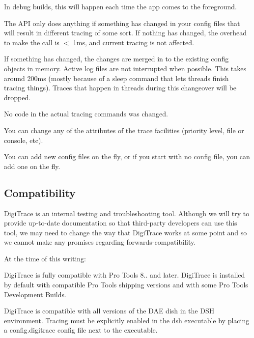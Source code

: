  
\begin{DoxyItemize}
\item In debug builds, this will happen each time the app comes to the foreground.  
\item The A\+P\+I only does anything if something has changed in your config files that will result in different tracing of some sort. If nothing has changed, the overhead to make the call is $<$ 1ms, and current tracing is not affected.  
\item If something has changed, the changes are merged in to the existing config objects in memory. Active log files are not interrupted when possible. This takes around 200ms (mostly because of a sleep command that lets threads finish tracing things). Traces that happen in threads during this changeover will be dropped.  
\item No code in the actual tracing commands was changed.  
\item You can change any of the attributes of the trace facilities (priority level, file or console, etc).  
\item You can add new config files on the fly, or if you start with no config file, you can add one on the fly.  
\end{DoxyItemize}



 \hypertarget{a00364_digitrace__compatibility}{}\subsection{Compatibility}\label{a00364_digitrace__compatibility}
 Digi\+Trace is an internal testing and troubleshooting tool. Although we will try to provide up-\/to-\/date documentation so that third-\/party developers can use this tool, we may need to change the way that Digi\+Trace works at some point and so we cannot make any promises regarding forwards-\/compatibility.

 At the time of this writing\+:
\begin{DoxyItemize}
\item Digi\+Trace is fully compatible with Pro Tools 8.. and later. Digi\+Trace is installed by default with compatible Pro Tools shipping versions and with some Pro Tools Development Builds.
\item Digi\+Trace is compatible with all versions of the D\+A\+E dish in the D\+S\+H environment. Tracing must be explicitly enabled in the dsh executable by placing a config.\+digitrace config file next to the executable.
\end{DoxyItemize}

